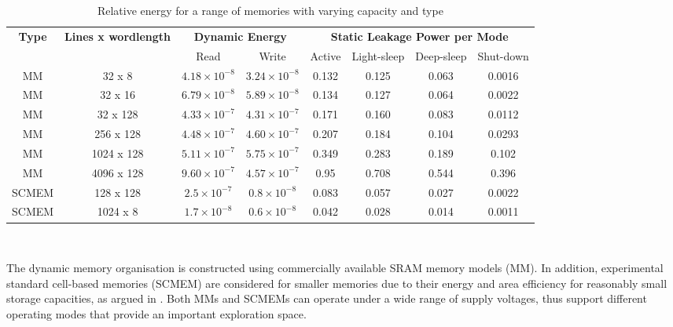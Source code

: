 \documentclass[a4paper,conference]{IEEEtran}
\begin{document}
\begin{center}
	\begin{table}[!t]
	\caption{Relative energy for a range of memories with varying capacity and type}
	\label{tab:relative}
	{\small
	\hfill{}
	\begin{tabular}{|c|c|c|c|c|c|c|c|}
		\hline
		\multirow{2}{*}{\textbf{Type}} & \multirow{2}{*}{\textbf{Lines x wordlength}} & \multicolumn{2}{c|}{\textbf{Dynamic Energy}}& \multicolumn{4}{c|}{\textbf{Static Leakage Power per Mode}}\\ \cline{3-8}
		& & Read & Write & Active & Light-sleep & Deep-sleep & Shut-down \\ 
		\hline 
		MM & 32 x 8 &  $ 4.18 \times 10^{-8} $ &  $ 3.24 \times 10^{-8} $ & 0.132 & 0.125 & 0.063 & 0.0016\\ 
		\hline
		MM & 32 x 16 & $  6.79 \times 10^{-8} $ &  $ 5.89 \times 10^{-8} $ & 0.134 & 0.127 & 0.064 & 0.0022\\ 
		\hline
		MM & 32 x 128 & $  4.33 \times 10^{-7} $ &  $ 4.31 \times 10^{-7} $ & 0.171 & 0.160 & 0.083 & 0.0112\\ 
		\hline
		MM & 256 x 128 & $  4.48 \times 10^{-7} $ &  $ 4.60 \times 10^{-7} $ & 0.207 & 0.184 & 0.104 & 0.0293\\ 
		\hline
		MM & 1024 x 128 & $  5.11 \times 10^{-7} $ &  $ 5.75 \times 10^{-7} $ & 0.349 & 0.283 & 0.189 & 0.102\\ 
		\hline
		MM & 4096 x 128 & $  9.60 \times 10^{-7} $ &  $ 4.57 \times 10^{-7} $ & 0.95 & 0.708 & 0.544 & 0.396\\ 
		\hline
		SCMEM & 128 x 128 & $  2.5 \times 10^{-7} $ &  $ 0.8 \times 10^{-8} $ & 0.083 & 0.057 & 0.027 & 0.0022\\ 
		\hline
		SCMEM & 1024 x 8 & $  1.7 \times 10^{-8} $ &  $ 0.6 \times 10^{-8} $ & 0.042 & 0.028 & 0.014 & 0.0011\\ 
		\hline
	\end{tabular}}
	\hfill{}
	\\
	\end{table}
\end{center}

The dynamic memory organisation is constructed using commercially available SRAM memory models (MM). In addition, experimental standard cell-based memories (SCMEM) \cite{Mei11}  are  considered for smaller memories due to their energy and area efficiency for reasonably small storage capacities, as argued in \cite{Mei10}. Both MMs and SCMEMs can operate under a wide range of supply voltages, thus support different operating modes that provide an important exploration space.
\end{document}
